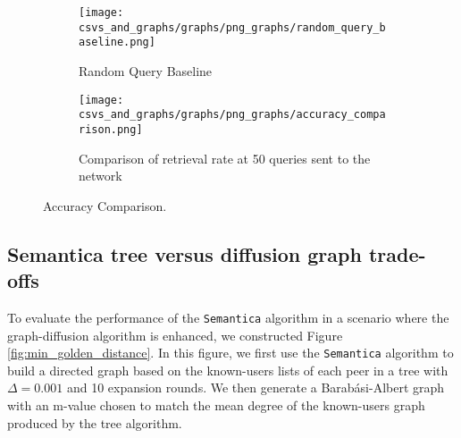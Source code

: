 \documentclass[10pt,journal]{IEEEtran}
\newcommand{\algorithmname}{\texttt{Semantica}}
\begin{document}
%             
%             
\begin{figure}
    \centering
    \begin{subfigure}[b]{0.45\textwidth} %
        \texttt{[image: csvs\_and\_graphs/graphs/png\_graphs/random\_query\_baseline.png]}
        \caption{Random Query Baseline}
        \label{fig:Random_query_baseline}
    \end{subfigure}
    \hfill %
    \hspace{1cm}
    \begin{subfigure}[b]{0.45\textwidth} %
        \texttt{[image: csvs\_and\_graphs/graphs/png\_graphs/accuracy\_comparison.png]}
        \caption{Comparison of retrieval rate at 50 queries sent to the network}
        \label{fig:Accuracy_comparison}
    \end{subfigure}
    \caption{Accuracy Comparison. }
    \label{fig:cc/accuracy_comparison}
\end{figure}


\subsection{Semantica tree versus diffusion graph trade-offs} %
To evaluate the performance of the \algorithmname{} algorithm in a scenario where the graph-diffusion algorithm is enhanced, we constructed Figure \ref{fig:min_golden_distance}. In this figure, we first use the \algorithmname{} algorithm to build a directed graph based on the known-users lists of each peer in a tree with $\Delta=0.001$ and 10 expansion rounds. We then generate a Barabási-Albert graph with an m-value chosen to match the mean degree of the known-users graph produced by the tree algorithm.
\end{document}

